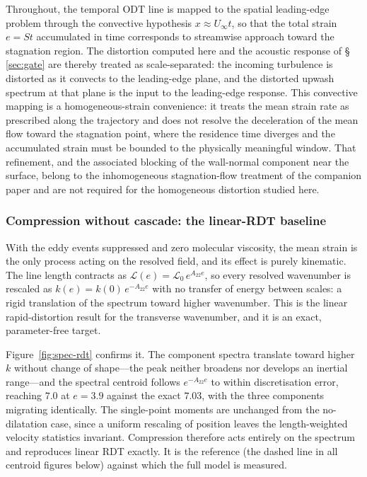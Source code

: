 \documentclass[lineno]{JFM-FLM_Au}
\begin{document}
Throughout, the temporal ODT line is mapped to the spatial leading-edge
problem through the convective hypothesis $x\approx U_\infty t$, so that the
total strain $e=St$ accumulated in time corresponds to streamwise approach
toward the stagnation region. The distortion computed here and the acoustic
response of \S\,\ref{sec:gate} are thereby treated as scale-separated: the
incoming turbulence is distorted as it convects to the leading-edge plane, and
the distorted upwash spectrum at that plane is the input to the leading-edge
response. This convective mapping is a homogeneous-strain convenience: it treats
the mean strain rate as prescribed along the trajectory and does not resolve the
deceleration of the mean flow toward the stagnation point, where the residence
time diverges and the accumulated strain must be bounded to the physically
meaningful window. That refinement, and the associated blocking of the
wall-normal component near the surface, belong to the inhomogeneous
stagnation-flow treatment of the companion paper and are not required for the
homogeneous distortion studied here.

\subsubsection{Compression without cascade: the linear-RDT
baseline}\label{sec:spec-rdt}

With the eddy events suppressed and zero molecular viscosity, the mean strain
is the only process acting on the resolved field, and its effect is purely
kinematic. The line length contracts as
$\mathcal{L}(e)=\mathcal{L}_0\,e^{A_{22}e}$, so every resolved wavenumber is
rescaled as $k(e)=k(0)\,e^{-A_{22}e}$ with no transfer of energy between
scales: a rigid translation of the spectrum toward higher wavenumber. This is
the linear rapid-distortion result \citep{BatchelorProudman1954,HuntCarruthers1990}
for the transverse wavenumber, and it is an exact, parameter-free target.

Figure~\ref{fig:spec-rdt} confirms it. The component spectra translate toward
higher $k$ without change of shape---the peak neither broadens nor develops an
inertial range---and the spectral centroid follows $e^{-A_{22}e}$ to within
discretisation error, reaching $7.0$ at $e=3.9$ against the exact $7.03$, with
the three components migrating identically. The single-point moments are
unchanged from the no-dilatation case, since a uniform rescaling of position
leaves the length-weighted velocity statistics invariant. Compression
therefore acts entirely on the spectrum and reproduces linear RDT exactly. It
is the reference (the dashed line in all centroid figures below) against which
the full model is measured.
\end{document}
